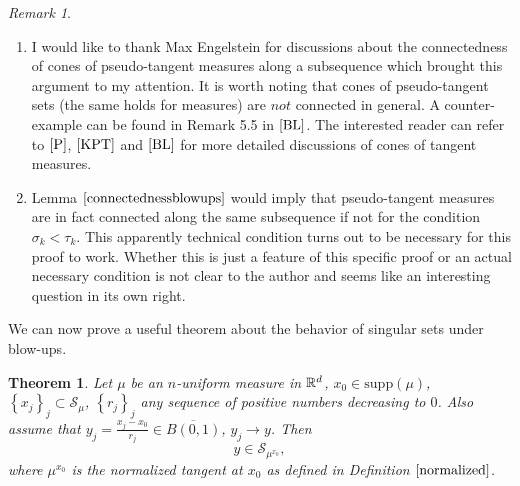 \documentclass[11pt]{article}
\newtheorem{theorem}{Theorem}[section]
\theoremstyle{definition}
\theoremstyle{remark}
\newtheorem{remark}{Remark}[section]
\numberwithin{equation}{section}
\begin{document}
\begin{remark}
\begin{enumerate}
\item I would like to thank Max Engelstein for discussions about the connectedness of cones of pseudo-tangent measures along a subsequence which brought this argument to my attention.
It is worth noting that cones of pseudo-tangent sets (the same holds for measures) are $\textit{not}$ connected in general. A counter-example can be found in Remark 5.5 in $\cite{BL}$. 
 The interested reader can refer to $\cite{P}$, $\cite{KPT}$ and $\cite{BL}$ for more detailed discussions of cones of tangent measures.
 
 \item  Lemma $\ref{connectednessblowups}$ would imply that pseudo-tangent measures are in fact connected along the same subsequence if not for the condition $\sigma_k < \tau_k$. This apparently technical condition turns out to be necessary for this proof to work. Whether this is just a feature of this specific proof or an actual necessary condition is not clear to the author and seems like an interesting question in its own right.
\end{enumerate}

\end{remark}
We can now prove a useful theorem about the behavior of singular sets under blow-ups.
\begin{theorem} \label{accumsing}
 Let $\mu$ be an $n$-uniform measure in $\mathbb{R}^d$, $x_0 \in \mbox{supp}(\mu)$, $\left\lbrace x_j \right\rbrace _{j} \subset \mathcal{S}_{\mu}$, $\left\lbrace r_j \right\rbrace _{j}$ any sequence of positive numbers decreasing to $0$.
Also assume that $y_j=\frac{x_j - x_0}{r_j} \in \overline{B(0,1)}$, $y_j \to y$.
Then $$y \in \mathcal{S}_{\mu^{x_0}},$$
where $\mu^{x_0}$ is the normalized tangent at $x_0$ as defined in Definition $\ref{normalized}$.
\end{theorem}
\end{document}
